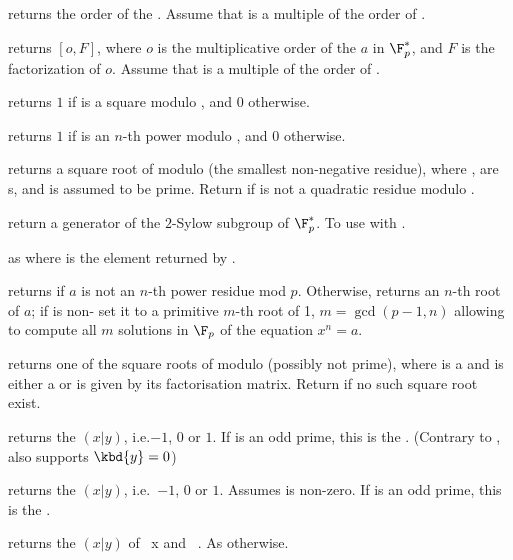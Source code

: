  returns the order of the
 . Assume that  is a multiple of the order of
.

 returns $[o,F]$, where $o$
is the multiplicative order of the  $a$ in $\F_p^*$, and $F$ is the
factorization of $o$. Assume that  is a multiple of the order of
.

 returns $1$ if  is a square
modulo , and $0$ otherwise.

 returns $1$ if  is an
$n$-th power modulo , and $0$ otherwise.

 returns a square root of  modulo
 (the smallest non-negative residue), where ,  are
s, and  is assumed to be prime. Return 
if  is not a quadratic residue modulo .

 return a generator of
the $2$-Sylow subgroup of $\F_p^*$. To use with .

as  where  is the element returned by
.

returns  if $a$ is not an $n$-th power residue mod $p$.
Otherwise, returns an $n$-th root of $a$; if  is non-
set it to a primitive $m$-th root of 1, $m = \gcd(p-1,n)$ allowing to compute
all $m$ solutions in $\F_p$ of the equation $x^n = a$.

 returns one of the square roots of 
modulo  (possibly not prime), where  is a  and 
is either a  or is given by its factorisation matrix.  Return
 if no such square root exist.

 returns the  $(x|y)$,
i.e.$-1$, $0$ or $1$. If  is an odd prime, this is the . (Contrary to ,  also supports $\kbd{y} = 0$)

 returns the 
$(x|y)$, i.e.~$-1$, $0$ or $1$. Assumes  is non-zero. If  is an
odd prime, this is the .

 returns the  $(x|y)$
of ~x and ~. As  otherwise.

